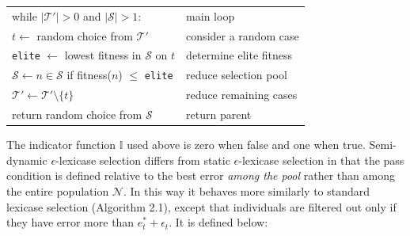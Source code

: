 \documentclass[twoside]{article}
\begin{document}
{\begin{tabularx}{\textwidth}{lX}
\hspace{1em}	while $|\mathcal{T}'| >0$ and $|\mathcal{S}|>1$:						&	main loop\\
\hspace{1em}\hspace{1em}	$t \leftarrow$ random choice from $\mathcal{T'}$  	&	\hspace{1em}consider a random case\\
\hspace{1em}\hspace{1em}	\texttt{elite} $\leftarrow$ lowest fitness in $\mathcal{S}$ on $t$ 	&	\hspace{1em}determine elite fitness\\
\hspace{1em}\hspace{1em}	$\mathcal{S} \leftarrow n \in \mathcal{S}$ if fitness($n$) $\leq$ \texttt{elite}	&	\hspace{1em}reduce selection pool\\
\hspace{1em}\hspace{1em}	$\mathcal{T'} \leftarrow \mathcal{T'} \setminus \{t\}$ 				&	\hspace{1em}reduce remaining cases\\
\hspace{1em} return random choice from $\mathcal{S}$															&	return parent  
\end{tabularx}
}
\medskip

The indicator function $\mathbb{I}$ used above is zero when false and one when true. Semi-dynamic $\epsilon$-lexicase selection differs from static $\epsilon$-lexicase selection in that the pass condition is defined relative to the best error {\it among the pool} rather than among the entire population $\mathcal{N}$. In this way it behaves more similarly to standard lexicase selection (Algorithm 2.1), except that individuals are filtered out only if they have error more than $e^*_t + \epsilon_t$. It is defined below:
\end{document}
